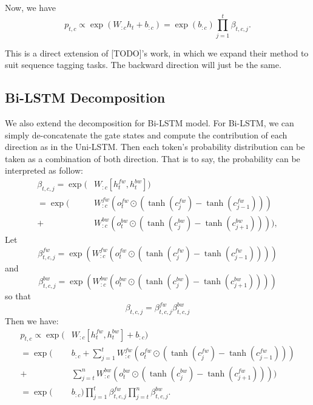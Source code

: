 \documentclass{article}
\begin{document}
Now, we have 
\begin{equation}
p_{t, c} \propto \exp( W_{:c} h_t + b_{:c}) = \exp(b_{:c})\prod_{j=1}^t \beta_{t, c, j}.
\end{equation}

This is a direct extension of [TODO]'s work, in which we expand their method to suit sequence tagging tasks.
The backward direction will just be the same.

\subsection{Bi-LSTM Decomposition}
\label{bi-lstm-decom}

We also extend the decomposition for Bi-LSTM model. For Bi-LSTM, we can simply de-concatenate the gate states and compute the contribution of each direction as in the Uni-LSTM. Then each token's probability distribution can be taken as a combination of both direction. That is to say, the probability can be interpreted as follow:
\begin{align}\label{eq:bi-beta} 
\beta_{t, c, j} = \exp(&W_{:c} [h_t^{fw}, h_t^{bw}])\\
= \exp(&W_{:c}^{fw} (o_t^{fw} \odot (\tanh(c_j^{fw})- \tanh(c_{j-1}^{fw}))) \\
+ &W_{:c}^{bw} (o_t^{bw} \odot (\tanh(c_j^{bw})- \tanh(c_{j+1}^{bw})))),
\end{align}
Let
\begin{equation}
\beta_{t, c, j}^{fw} = \exp(W_{:c}^{fw} (o_t^{fw} \odot (\tanh(c_j^{fw})- \tanh(c_{j-1}^{fw}))))
\end{equation}
and
\begin{equation}
\beta_{t, c, j}^{bw} = \exp(W_{:c}^{bw} (o_t^{bw} \odot (\tanh(c_j^{bw})- \tanh(c_{j+1}^{bw}))))
\end{equation}
so that 
\begin{equation}
\beta_{t, c, j} = \beta_{t, c, j}^{fw} \beta_{t, c, j}^{bw}
\end{equation}
Then we have:
\begin{align}
p_{t, c} \propto \exp(&W_{:c} [h_t^{fw}, h_t^{bw}] + b_{:c}) \\
= \exp(&b_{:c} + \sum_{j=1}^t W_{:c}^{fw} (o_t^{fw} \odot (\tanh(c_j^{fw}) - \tanh(c_{j-1}^{fw})))\\
	+&\sum_{j=t}^n W_{:c}^{bw} (o_t^{bw} \odot (\tanh(c_j^{bw}) - \tanh(c_{j+1}^{fw}))))\\
=  \exp(&b_{:c})\prod_{j=1}^t \beta_{t, c, j}^{fw} \prod_{j=t}^n \beta_{t, c, j}^{bw}.
\end{align}
\end{document}
